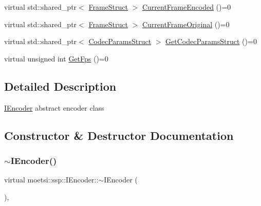 \begin{DoxyCompactItemize}
\item 
virtual std\+::shared\+\_\+ptr$<$ \hyperlink{structmoetsi_1_1ssp_1_1FrameStruct}{Frame\+Struct} $>$ \hyperlink{classmoetsi_1_1ssp_1_1IEncoder_a178d117518e7c7007414ea9c82bd3ed6}{Current\+Frame\+Encoded} ()=0
\item 
virtual std\+::shared\+\_\+ptr$<$ \hyperlink{structmoetsi_1_1ssp_1_1FrameStruct}{Frame\+Struct} $>$ \hyperlink{classmoetsi_1_1ssp_1_1IEncoder_ab60bdaae0a85289dfa31a12bab533dc0}{Current\+Frame\+Original} ()=0
\item 
virtual std\+::shared\+\_\+ptr$<$ \hyperlink{structmoetsi_1_1ssp_1_1CodecParamsStruct}{Codec\+Params\+Struct} $>$ \hyperlink{classmoetsi_1_1ssp_1_1IEncoder_ad5179efaa4c74207766dd64f46f4059a}{Get\+Codec\+Params\+Struct} ()=0
\item 
virtual unsigned int \hyperlink{classmoetsi_1_1ssp_1_1IEncoder_ae6a865aa52230d81aed1cb5232402f6c}{Get\+Fps} ()=0
\end{DoxyCompactItemize}


\subsection{Detailed Description}
\hyperlink{classmoetsi_1_1ssp_1_1IEncoder}{I\+Encoder} abstract encoder class 

\subsection{Constructor \& Destructor Documentation}
\mbox{\label{classmoetsi_1_1ssp_1_1IEncoder_a6c19808ebe6a05dbce630c45188b9346}} 
\subsubsection{\texorpdfstring{$\sim$\+I\+Encoder()}{~IEncoder()}\hspace{0.1cm}{\footnotesize\ttfamily [1/2]}}
{\footnotesize\ttfamily virtual moetsi\+::ssp\+::\+I\+Encoder\+::$\sim$\+I\+Encoder (\begin{DoxyParamCaption}{ }\end{DoxyParamCaption})\hspace{0.3cm}{\ttfamily [inline]}, {\ttfamily [virtual]}}

